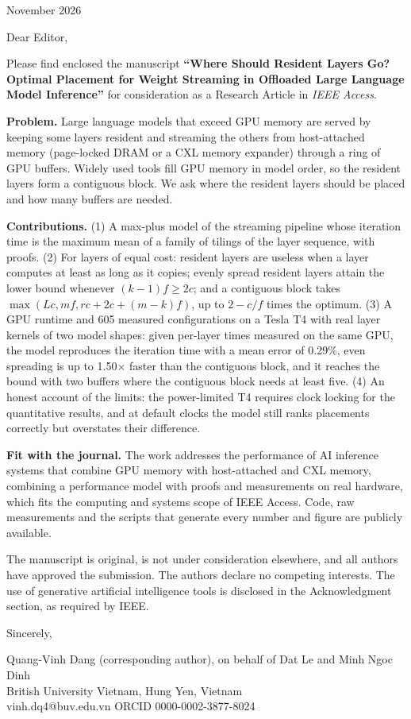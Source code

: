 \documentclass[11pt]{article}
\begin{document}
\begin{flushright}November 2026\end{flushright}

Dear Editor,

Please find enclosed the manuscript \textbf{``Where Should Resident Layers Go? Optimal Placement for Weight Streaming in Offloaded Large Language Model Inference''} for consideration as a Research Article in \emph{IEEE Access}.

\textbf{Problem.} Large language models that exceed GPU memory are served by keeping some layers resident and streaming the others from host-attached memory (page-locked DRAM or a CXL memory expander) through a ring of GPU buffers. Widely used tools fill GPU memory in model order, so the resident layers form a contiguous block. We ask where the resident layers should be placed and how many buffers are needed.

\textbf{Contributions.} (1) A max-plus model of the streaming pipeline whose iteration time is the maximum mean of a family of tilings of the layer sequence, with proofs. (2) For layers of equal cost: resident layers are useless when a layer computes at least as long as it copies; evenly spread resident layers attain the lower bound whenever $(k-1)f\ge2c$; and a contiguous block takes $\max(Lc,mf,rc+2c+(m-k)f)$, up to $2-c/f$ times the optimum. (3) A GPU runtime and 605 measured configurations on a Tesla T4 with real layer kernels of two model shapes: given per-layer times measured on the same GPU, the model reproduces the iteration time with a mean error of 0.29\%, even spreading is up to 1.50$\times$ faster than the contiguous block, and it reaches the bound with two buffers where the contiguous block needs at least five. (4) An honest account of the limits: the power-limited T4 requires clock locking for the quantitative results, and at default clocks the model still ranks placements correctly but overstates their difference.

\textbf{Fit with the journal.} The work addresses the performance of AI inference systems that combine GPU memory with host-attached and CXL memory, combining a performance model with proofs and measurements on real hardware, which fits the computing and systems scope of IEEE Access. Code, raw measurements and the scripts that generate every number and figure are publicly available.

The manuscript is original, is not under consideration elsewhere, and all authors have approved the submission. The authors declare no competing interests. The use of generative artificial intelligence tools is disclosed in the Acknowledgment section, as required by IEEE.

Sincerely,

Quang-Vinh Dang (corresponding author), on behalf of Dat Le and Minh Ngoc Dinh\\
British University Vietnam, Hung Yen, Vietnam\\
vinh.dq4@buv.edu.vn \quad ORCID 0000-0002-3877-8024
\end{document}
